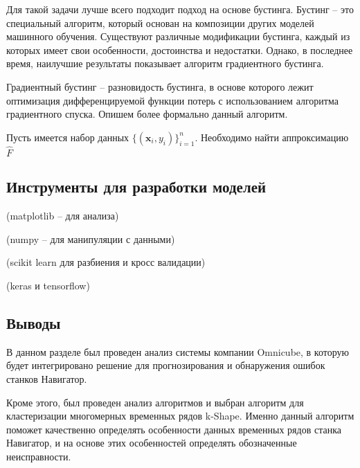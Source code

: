 Для такой задачи лучше всего подходит подход на основе бустинга.
Бустинг -- это специальный алгоритм,
который основан на композиции других моделей машинного обучения.
Существуют различные модификации бустинга,
каждый из которых имеет свои особенности,
достоинства и недостатки.
Однако, в последнее время, наилучшие результаты
показывает алгоритм градиентного бустинга.

Градиентный бустинг -- разновидость бустинга,
в основе которого лежит
оптимизация дифференцируемой функции потерь
с использованием алгоритма градиентного спуска.
Опишем более формально данный алгоритм.

Пусть имеется набор данных $\{(\textbf{x}_i,y_i)\}_{i=1}^n$.
Необходимо найти аппроксимацию $\hat{F}$

\subsection{Инструменты для разработки моделей}

(matplotlib -- для анализа)

(numpy -- для манипуляции с данными)

(scikit learn для разбиения и кросс валидации)

(keras и tensorflow)

\subsection{Выводы}

В данном разделе был проведен анализ системы компании Omnicube, в которую
будет интегрировано решение для прогнозирования и обнаружения ошибок станков Навигатор.

Кроме этого, был проведен анализ алгоритмов и выбран алгоритм для кластеризации многомерных временных рядов k-Shape.
Именно данный алгоритм поможет качественно определять особенности данных временных рядов станка Навигатор,
и на основе этих особенностей определять обозначенные неисправности.

\clearpage